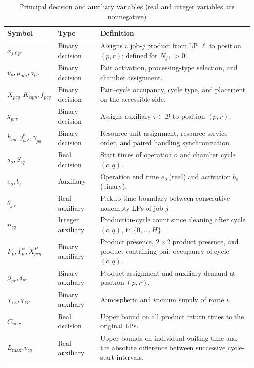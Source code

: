 \documentclass[final,5p,times,twocolumn]{elsarticle}
\begin{document}
\begin{table}[t]
\centering\small
\caption{Principal decision and auxiliary variables (real and integer variables are nonnegative)}
\label{tab:symbol-cn-b}
\renewcommand{\arraystretch}{1.05}
\setlength{\tabcolsep}{4pt}
\begin{tabular}{@{}C{0.20\textwidth}C{0.16\textwidth}C{\textwidth-16pt\relax}@{}}
\toprule
Symbol & Type & Definition\\\midrule
$x_{j\ell pr}$ & Binary decision & Assigns a job-$j$ product from LP $\ell$ to position $(p,r)$; defined for $N_{j\ell}>0$.\\
$v_p,\mu_{pm},z_{pc}$ & Binary decision & Pair activation, processing-type selection, and chamber assignment.\\
$X_{pcq},K_{cqm},f_{pcq}$ & Binary decision & Pair--cycle occupancy, cycle type, and placement on the accessible side.\\
$g_{pr\tau}$ & Binary decision & Assigns auxiliary $\tau\in\mathcal D$ to position $(p,r)$.\\
$h_{ou},y^\rho_{oo'},\gamma_{pa}$ & Binary decision & Resource-unit assignment, resource service order, and paired handling synchronization.\\
$s_o,S_{cq}$ & Real decision & Start times of operation $o$ and chamber cycle $(c,q)$.\\
$e_o,b_o$ & Auxiliary & Operation end time $e_o$ (real) and activation $b_o$ (binary).\\
$\theta_{j\ell}$ & Real auxiliary & Pickup-time boundary between consecutive nonempty LPs of job $j$.\\
$n_{cq}$ & Integer auxiliary & Production-cycle count since cleaning after cycle $(c,q)$, in $\{0,\ldots,H\}$.\\
$F_p,F_p^\psi,X^P_{pcq}$ & Binary auxiliary & Product presence, $2\times2$ product presence, and product-containing pair occupancy of cycle $(c,q)$.\\
$\beta_{pr},d_{pr}$ & Binary auxiliary & Product assignment and auxiliary demand at position $(p,r)$.\\
$\chi_{iA},\chi_{iV}$ & Binary auxiliary & Atmospheric and vacuum supply of route $i$.\\
$C_{\max}$ & Real decision & Upper bound on all product return times to the original LPs.\\
$L_{\max},v_{cq}$ & Real auxiliary & Upper bounds on individual waiting time and the absolute difference between successive cycle-start intervals.\\
\bottomrule
\end{tabular}
\end{table}
\end{document}
